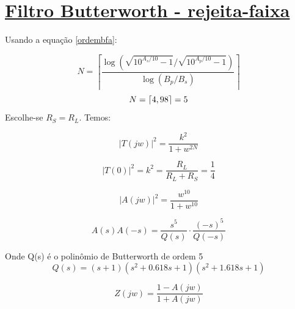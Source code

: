 \documentclass[14pt, oneside]{book}
\DeclarePairedDelimiter{\ceil}{\lceil}{\rceil}
\newcommand\tab[1][1cm]{\hspace*{#1}}
\theoremstyle{definition}
\begin{document}
            
             
             
             
            
            \chapter[Filtro Butterworth - rejeita-faixa]{\hyperlink{toc}{Filtro Butterworth - rejeita-faixa}}
            
            \tab  Usando a equação \ref{ordembfa}:
              
            \begin{equation}
            \label{ordembfa}
            N = \left\lceil{\frac{{\log{(\sqrt{10^{A_s/10}-1}/\sqrt{10^{A_p/10}-1})}}}{{\log{(B_p/B_s)}}}}\right\rceil
            \end{equation}
            \begin{equation}
            N = \ceil{4,98} = 5
            \end{equation}
            Escolhe-se $R_S = R_L$.
            Temos:
            
            \begin{equation}
            |T(jw)|^2 = \frac{k^2}{1+w^{2N}}
            \end{equation}
            
            \begin{equation}
            |T(0)|^2 = k^2 = \frac{R_L}{R_L+R_S}=\frac{1}{4}
            \end{equation}
            
            \begin{equation}
            |A(jw)|^2 = \frac{w^{10}}{1+w^{10}}
            \end{equation}
            
            \begin{equation}
            A(s)A(-s) = \frac{s^5}{Q(s)}\cdot \frac{(-s)^5}{Q(-s)}
            \end{equation}
            
            Onde Q(s) é o polinômio de Butterworth de ordem 5
            \begin{equation}
            Q(s) = (s+1)(s^2+0.618s+1)(s^2+1.618s+1)
            \end{equation}
            
            \begin{equation}
            \label{eq}
            Z(jw) = \frac{1- A(jw)}{1+ A(jw)}
            \end{equation}
            
\end{document}
